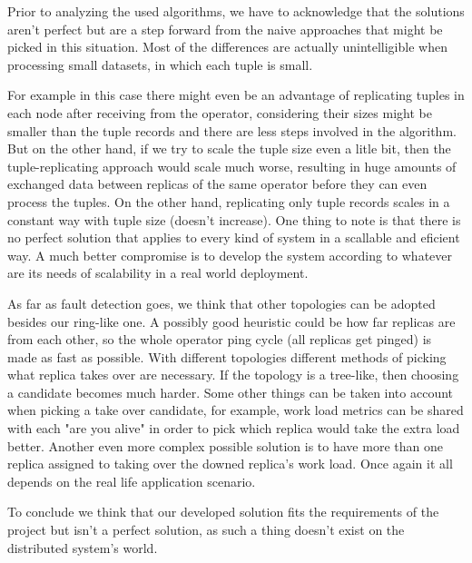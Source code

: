 \documentclass[times, 10pt,twocolumn]{article}
\begin{document}

Prior to analyzing the used algorithms, we have to acknowledge that the
solutions aren't perfect but are a step forward from the naive approaches
that might be picked in this situation. Most of the differences are
actually unintelligible when processing small datasets, in which each
tuple is small. 

For example in this case there might even be an advantage of replicating tuples in
each node after receiving from the operator, considering their sizes might
be smaller than the tuple records and there are less steps involved
in the algorithm. But on the other hand, if we try to scale the tuple size
even a litle bit, then the tuple-replicating approach would scale much
worse, resulting in huge amounts of exchanged data between replicas of the
same operator before they can even process the tuples. On the other hand,
replicating only tuple records scales in a constant way with tuple size
(doesn't increase).  One thing to note
is that there is no perfect solution that applies to every kind of system
in a scallable and eficient way.  A much better compromise is to develop
the system according to whatever are its needs of scalability in a real world deployment.

As far as fault detection goes, we think that other topologies can be
adopted besides our ring-like one. A possibly good heuristic could be how far
replicas are from each other, so the whole operator ping cycle (all
replicas get pinged) is made as fast as possible. With different
topologies different methods of picking what replica takes over are
necessary. If the topology is a tree-like, then choosing a candidate
becomes much harder. Some other things can be taken into account when
picking a take over candidate, for example, work load metrics can be
shared with each "are you alive" in order to pick which replica would take
the extra load better. Another even more complex possible solution is to
have more than one replica assigned to taking over the downed replica's
work load. Once again it all depends on the real life application scenario.

To conclude we think that our developed solution fits the requirements of the project but isn't a perfect solution, as such a thing doesn't exist on the distributed system's world.
\end{document}
